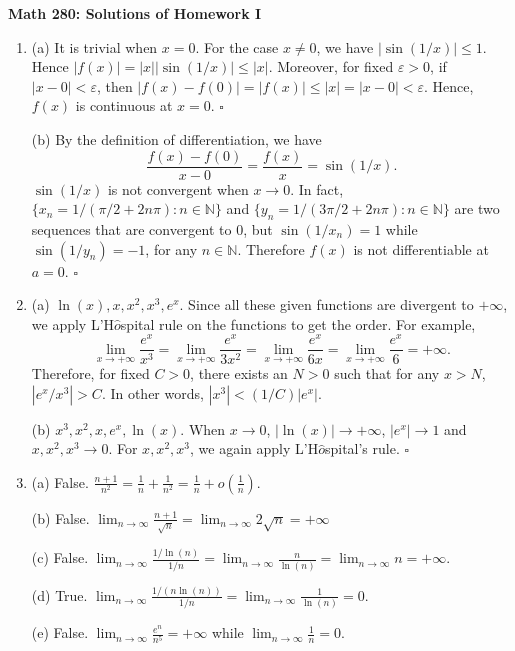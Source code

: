 \documentclass[12pt]{article}
\newcommand{\N}{\mathbb{N}}
\renewcommand{\proof}{\noindent {\bf Proof. }}
\newcommand{\solution}{\noindent {\bf Solution. }}
\newcommand{\fin}{\hfill $\square$}
\begin{document}
\begin{center}
{\bf Math 280: Solutions of Homework I}
\end{center}
\begin{enumerate}
\item
\proof
(a) It is trivial when $x=0$. For the case $x\neq 0$, we have $|\sin(1/x)|\leq 1$. Hence $|f(x)|=|x||\sin(1/x)|\leq |x|$. Moreover, for fixed $\varepsilon>0$, if $|x-0|<\varepsilon$, then $|f(x)-f(0)|=|f(x)|\leq |x|=|x-0|<\varepsilon$. Hence, $f(x)$ is continuous at $x=0$. \fin

(b) By the definition of differentiation, we have $$\frac{f(x)-f(0)}{x-0} = \frac{f(x)}{x} = \sin(1/x).$$ $\sin(1/x)$ is not convergent when $x\rightarrow 0$. In fact, $\{x_n=1/(\pi/2+2n\pi):n\in\N\}$ and $\{y_n=1/(3\pi/2+2n\pi):n\in\N\}$ are two sequences that are convergent to $0$, but $\sin(1/x_n)=1$ while $\sin(1/y_n)=-1$, for any $n\in\N$. Therefore $f(x)$ is not differentiable at $a=0$. \fin

\item
\solution
(a) $\ln(x), x, x^2, x^3, e^x$. Since all these given functions are divergent to $+\infty$, we apply L'H$\hat{o}$spital rule on the functions to get the order. For example, $$\lim_{x \rightarrow + \infty} \frac{e^x}{x^3} = \lim_{x \rightarrow + \infty} \frac{e^x}{3x^2} = \lim_{x \rightarrow + \infty} \frac{e^x}{6x} = \lim_{x \rightarrow + \infty} \frac{e^x}{6}= + \infty.$$ Therefore, for fixed $C>0$, there exists an $N>0$ such that for any $x>N$, $|e^x/x^3|>C$. In other words, $|x^3|<(1/C)|e^x|$.

(b) $x^3, x^2,x, e^x, \ln(x)$. When $x\rightarrow 0$, $|\ln(x)|\rightarrow + \infty$, $|e^x|\rightarrow 1$ and $x,x^2,x^3\rightarrow 0$. For $x,x^2,x^3$, we again apply L'H$\hat{o}$spital's rule. \fin

\item
\proof
(a) False. $\frac{n+1}{n^2}=\frac{1}{n}+\frac{1}{n^2}=\frac{1}{n}+o(\frac{1}{n})$.

(b) False. $\lim_{n\rightarrow \infty}\frac{n+1}{\sqrt{n}}=\lim_{n\rightarrow \infty}2\sqrt{n}=+ \infty$

(c) False. $\lim_{n\rightarrow \infty}\frac{1/\ln(n)}{1/n}=\lim_{n\rightarrow \infty}\frac{n}{\ln(n)}=\lim_{n\rightarrow \infty}n = +\infty$.

(d) True. $\lim_{n\rightarrow \infty}\frac{1/(n\ln(n))}{1/n} = \lim_{n\rightarrow \infty}\frac{1}{\ln(n)} = 0$.

(e) False. $\lim_{n\rightarrow \infty}\frac{e^n}{n^5} = +\infty$ while $ \lim_{n\rightarrow \infty}\frac{1}{n}=0$.


\end{enumerate}
\end{document}
